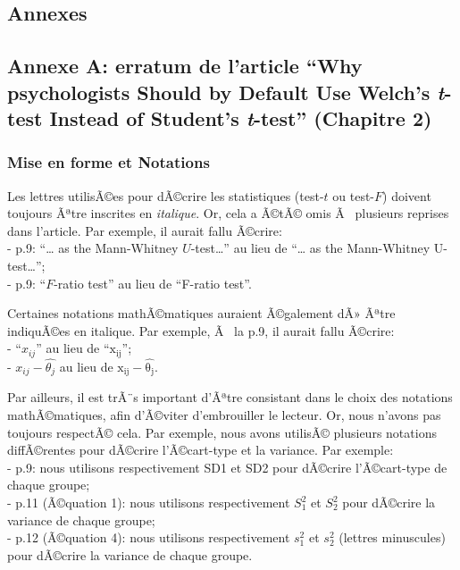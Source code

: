 \clearpage



\begin{appendix}
\hypertarget{annexes}{%
\section{Annexes}\label{annexes}}

\hypertarget{annexe-a-erratum-de-larticle-why-psychologists-should-by-default-use-welchs-t-test-instead-of-students-t-test-chapitre-2}{%
\subsection{\texorpdfstring{Annexe A: erratum de l'article ``Why
psychologists Should by Default Use Welch's \emph{t}-test Instead of
Student's \emph{t}-test'' (Chapitre
2)}{Annexe A: erratum de l'article ``Why psychologists Should by Default Use Welch's t-test Instead of Student's t-test'' (Chapitre 2)}}\label{annexe-a-erratum-de-larticle-why-psychologists-should-by-default-use-welchs-t-test-instead-of-students-t-test-chapitre-2}}

\hypertarget{mise-en-forme-et-notations}{%
\subsubsection{Mise en forme et
Notations}\label{mise-en-forme-et-notations}}

Les lettres utilisÃ©es pour dÃ©crire les statistiques (test-\(t\) ou
test-\(F\)) doivent toujours Ãªtre inscrites en \emph{italique}. Or,
cela a Ã©tÃ© omis Ã~ plusieurs reprises dans l'article. Par exemple, il
aurait fallu Ã©crire:\\
- p.9: ``\ldots{} as the Mann-Whitney \(U\)-test\ldots{}'' au lieu de
``\ldots{} as the Mann-Whitney U-test\ldots{}'';\\
- p.9: ``\(F\)-ratio test'' au lieu de ``F-ratio test''.

Certaines notations mathÃ©matiques auraient Ã©galement dÃ» Ãªtre
indiquÃ©es en italique. Par exemple, Ã~ la p.9, il aurait fallu
Ã©crire:\\
- ``\(x_{ij}\)'' au lieu de ``\(\mathrm{x_{ij}}\)'';\\
- \textbar{}\(x_{ij}-\hat{\theta_j}\)\textbar{} au lieu de
\textbar{}\(\mathrm{x_{ij}-\hat{\theta_j}}\)\textbar.

Par ailleurs, il est trÃ¨s important d'Ãªtre consistant dans le choix
des notations mathÃ©matiques, afin d'Ã©viter d'embrouiller le lecteur.
Or, nous n'avons pas toujours respectÃ© cela. Par exemple, nous avons
utilisÃ© plusieurs notations diffÃ©rentes pour dÃ©crire l'Ã©cart-type et
la variance. Par exemple:\\
- p.9: nous utilisons respectivement SD1 et SD2 pour dÃ©crire
l'Ã©cart-type de chaque groupe;\\
- p.11 (Ã©quation 1): nous utilisons respectivement \(S^2_1\) et
\(S^2_2\) pour dÃ©crire la variance de chaque groupe;\\
- p.12 (Ã©quation 4): nous utilisons respectivement \(s^2_1\) et
\(s^2_2\) (lettres minuscules) pour dÃ©crire la variance de chaque
groupe.


\end{appendix}
